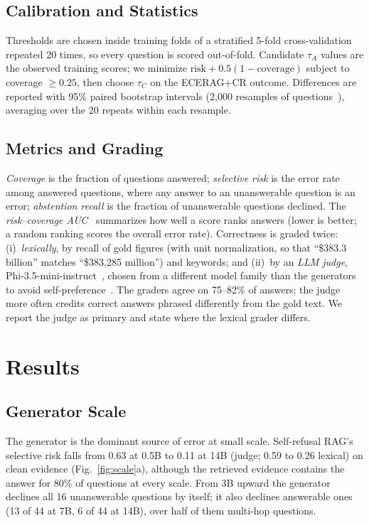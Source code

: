 \documentclass[conference,letterpaper]{IEEEtran}
\newcommand{\tA}{\tau_A}
\newcommand{\tC}{\tau_C}
\begin{document}
\subsection{Calibration and Statistics}
Thresholds are chosen inside training folds of a stratified 5-fold cross-validation repeated 20
times, so every question is scored out-of-fold. Candidate $\tA$ values are the observed training
scores; we minimize $\text{risk}+0.5(1-\text{coverage})$ subject to coverage $\ge0.25$, then choose
$\tC$ on the ECERAG+CR outcome. Differences are reported with 95\% paired bootstrap intervals
(2{,}000 resamples of questions~\cite{efron1993bootstrap}), averaging over the 20 repeats within each
resample.

\subsection{Metrics and Grading}
\emph{Coverage} is the fraction of questions answered; \emph{selective risk} is the error rate
among answered questions, where any answer to an unanswerable question is an error;
\emph{abstention recall} is the fraction of unanswerable questions declined. The
\emph{risk--coverage AUC}~\cite{elyaniv2010} summarizes how well a score ranks answers (lower is
better; a random ranking scores the overall error rate). Correctness is graded twice:
(i)~\emph{lexically}, by recall of gold figures (with unit normalization, so that
``\$383.3 billion'' matches ``\$383,285 million'') and keywords; and (ii)~by an \emph{LLM judge},
Phi-3.5-mini-instruct~\cite{abdin2024phi3}, chosen from a different model family than the
generators to avoid self-preference~\cite{zheng2023judge}. The graders agree on 75--82\% of answers;
the judge more often credits correct answers phrased differently from the gold text. We report
the judge as primary and state where the lexical grader differs.

\section{Results}
\subsection{Generator Scale}
The generator is the dominant source of error at small scale. Self-refusal RAG's selective risk
falls from 0.63 at 0.5B to 0.11 at 14B (judge; 0.59 to 0.26 lexical) on clean evidence
(Fig.~\ref{fig:scale}a), although the retrieved evidence contains the answer for 80\% of
questions at every scale. From 3B upward the generator declines all 16 unanswerable questions by
itself; it also declines answerable ones (13 of 44 at 7B, 6 of 44 at 14B), over half of them multi-hop questions.
\end{document}
